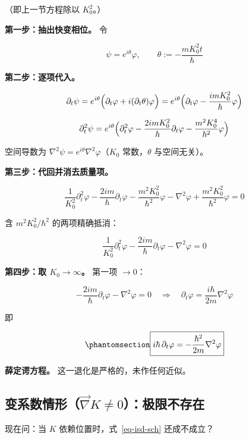 \documentclass[
  chinese,
  a4paper,
  UTF8,
  12pt,
  oneside,
  openany]{ctexbook}
\theoremstyle{plain}
\theoremstyle{plain}
\theoremstyle{plain}
\theoremstyle{definition}
\theoremstyle{plain}
\theoremstyle{plain}
\theoremstyle{remark}
\begin{document}
（即上一节方程除以 \(K_0^{2}\)。）

\textbf{第一步：抽出快变相位。} 令

\[
\psi=e^{i\theta}\varphi,\qquad \theta:=-\frac{mK_0^{2}t}{\hbar}
\]

\textbf{第二步：逐项代入。}

\[
\partial_t\psi=e^{i\theta}\Bigl(\partial_t\varphi+i(\partial_t\theta)\varphi\Bigr)
=e^{i\theta}\Bigl(\partial_t\varphi-\frac{imK_0^{2}}{\hbar}\varphi\Bigr)
\]

\[
\partial_t^{2}\psi=e^{i\theta}\Bigl(\partial_t^{2}\varphi
-\frac{2imK_0^{2}}{\hbar}\partial_t\varphi
-\frac{m^{2}K_0^{4}}{\hbar^{2}}\varphi\Bigr)
\]

空间导数为 \(\nabla^{2}\psi=e^{i\theta}\nabla^{2}\varphi\)（\(K_0\)
常数，\(\theta\) 与空间无关）。

\textbf{第三步：代回并消去质量项。}

\[
\frac{1}{K_0^{2}}\partial_t^{2}\varphi
-\frac{2im}{\hbar}\partial_t\varphi
-\frac{m^{2}K_0^{2}}{\hbar^{2}}\varphi
-\nabla^{2}\varphi
+\frac{m^{2}K_0^{2}}{\hbar^{2}}\varphi=0
\]

含 \(m^{2}K_0^{2}/\hbar^{2}\) 的两项精确抵消：

\[
\frac{1}{K_0^{2}}\partial_t^{2}\varphi-\frac{2im}{\hbar}\partial_t\varphi-\nabla^{2}\varphi=0
\]

\textbf{第四步：取 \(K_0\to\infty\)。} 第一项 \(\to0\)：

\[
-\frac{2im}{\hbar}\partial_t\varphi-\nabla^{2}\varphi=0
\quad\Longrightarrow\quad
\partial_t\varphi=\frac{i\hbar}{2m}\nabla^{2}\varphi
\]

即

\begin{equation}\protect\phantomsection\label{eq-isd-sch}{
\boxed{i\hbar\,\partial_t\varphi=-\frac{\hbar^{2}}{2m}\nabla^{2}\varphi}
}\end{equation}

\textbf{薛定谔方程。} 这一退化是严格的，未作任何近似。

\subsection{\texorpdfstring{变系数情形（\(\vec\nabla K\neq0\)）：极限不存在}{变系数情形（\textbackslash vec\textbackslash nabla K\textbackslash neq0）：极限不存在}}\label{ux53d8ux7cfbux6570ux60c5ux5f62vecnabla-kneq0ux6781ux9650ux4e0dux5b58ux5728}

现在问：当 \(K\) 依赖位置时，式~\ref{eq-isd-sch} 还成不成立？
\end{document}
